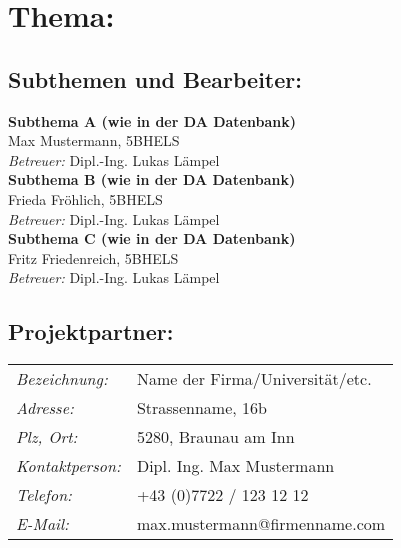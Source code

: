 

\chapter*{Thema: \newline \htlArbeitsthema }



\section*{Subthemen und Bearbeiter:}


\textbf{Subthema A (wie in der DA Datenbank)}\\ 
Max Mustermann, 5BHELS\\
\emph{Betreuer:} Dipl.-Ing. Lukas Lämpel\\[2ex] 
%
\textbf{Subthema B (wie in der DA Datenbank)}\\ 
Frieda Fröhlich, 5BHELS\\
\emph{Betreuer:} Dipl.-Ing. Lukas Lämpel\\[2ex] 
%
\textbf{Subthema C (wie in der DA Datenbank)}\\ 
Fritz Friedenreich, 5BHELS\\
\emph{Betreuer:} Dipl.-Ing. Lukas Lämpel\\[2em]



\section*{Projektpartner:}

\renewcommand{\arraystretch}{1.5}
\begin{tabularx}{1\textwidth}{@{} l X @{}}

\emph{Bezeichnung:} & Name der Firma/Universität/etc.\\
\emph{Adresse:} & Strassenname, 16b\\
\emph{Plz, Ort:} & 5280, Braunau am Inn\\
\emph{Kontaktperson:} & Dipl. Ing. Max Mustermann\\
\emph{Telefon:} & +43 (0)7722 / 123 12 12\\
\emph{E-Mail:} & max.mustermann@firmenname.com\\

\end{tabularx}
